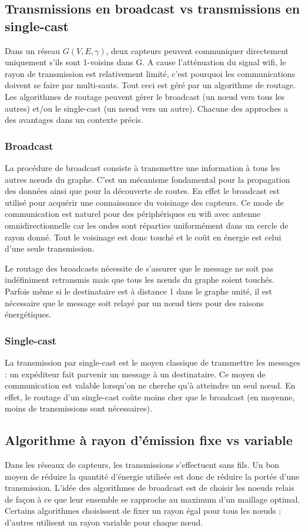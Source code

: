 \subsection{Transmissions en broadcast vs transmissions en single-cast}
Dans un réseau $G(V,E,\gamma)$, deux capteurs peuvent communiquer directement uniquement s'ils sont 1-voisins dans G. A cause l'atténuation du signal wifi, le rayon de transmission est relativement limité, c'est pourquoi les communications doivent se faire par multi-sauts. Tout ceci est géré par un algorithme de routage. Les algorithmes de routage peuvent gérer le broadcast (un nœud vers tous les autres) et/ou le single-cast (un nœud vers un autre). Chacune des approches a des avantages dans un contexte précis.

\subsubsection{Broadcast}
La procédure de broadcast consiste à transmettre une information à tous les autres nœuds du graphe. C'est un mécanisme fondamental pour la propagation des données ainsi que pour la découverte de routes. En effet le broadcast est utilisé pour acquérir une connaissance du voisinage des capteurs. Ce mode de communication est naturel pour des périphériques en wifi avec antenne omnidirectionnelle car les ondes sont réparties uniformément dans un cercle de rayon donné. Tout le voisinage est donc touché et le coût en énergie est celui d'une seule transmission.

Le routage des broadcasts nécessite de s'assurer que le message ne soit pas indéfiniment retransmis mais que tous les nœuds du graphe soient touchés. Parfois même si le destinataire est à distance 1 dans le graphe unité, il est nécessaire que le message soit relayé par un nœud tiers pour des raisons énergétiques.

\subsubsection{Single-cast}
La transmission par single-cast est le moyen classique de transmettre les messages : un expéditeur fait parvenir un message à un destinataire. Ce moyen de communication est valable lorsqu'on ne cherche qu'à atteindre un seul nœud. En effet, le routage d'un single-cast coûte moins cher que le broadcast (en moyenne, moins de transmissions sont nécessaires).


\subsection{Algorithme à rayon d'émission fixe vs variable}
Dans les réseaux de capteurs, les transmissions s'effectuent sans fils. Un bon moyen de réduire la quantité d'énergie utilisée est donc de réduire la portée d'une transmission. L'idée des algorithmes de broadcast est de choisir les noeuds relais de façon à ce que leur ensemble se rapproche au maximum d'un maillage optimal. Certains algorithmes choisissent de fixer un rayon égal pour tous les nœuds ; d'autres utilisent un rayon variable pour chaque nœud. 

